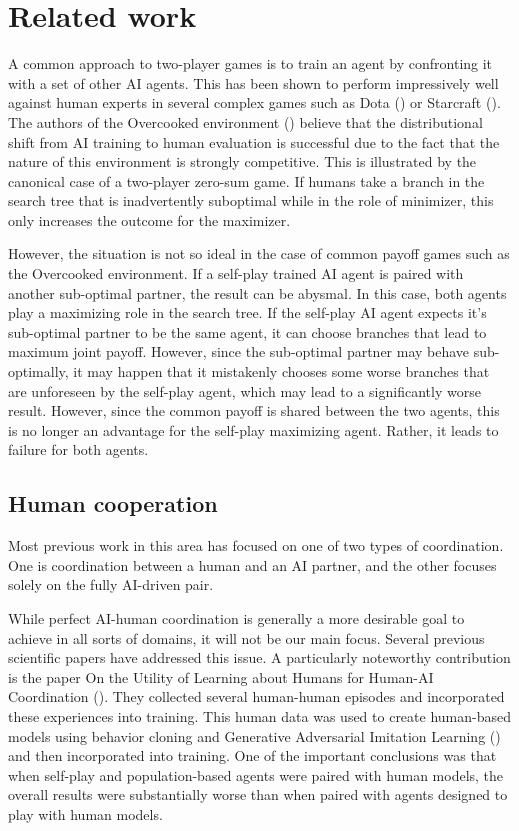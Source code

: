\chapter{Related work}\label{RelatedWorkChapter}

A common approach to two-player games is to train an agent by confronting it with a set of other AI agents.
This has been shown to perform impressively well against human experts in several complex games such as Dota (\cite{DotaOpenFive}) or Starcraft (\cite{Starcraft}).
The authors of the Overcooked environment (\cite{carroll2020utility}) believe that the distributional shift from AI training to human evaluation is successful due to the fact that the nature of this environment is strongly competitive.
This is illustrated by the canonical case of a two-player zero-sum game.
If humans take a branch in the search tree that is inadvertently suboptimal while in the role of minimizer, this only increases the outcome for the maximizer.

However, the situation is not so ideal in the case of common payoff games such as the Overcooked environment.
If a self-play trained AI agent is paired with another sub-optimal partner, the result can be abysmal. 
In this case, both agents play a maximizing role in the search tree. 
If the self-play AI agent expects it's sub-optimal partner to be the same agent, it can choose branches that lead to maximum joint payoff.
However, since the sub-optimal partner may behave sub-optimally, it may happen that it mistakenly chooses some worse branches that are unforeseen by the self-play agent, which may lead to a significantly worse result.
However, since the common payoff is shared between the two agents, this is no longer an advantage for the self-play maximizing agent.
Rather, it leads to failure for both agents.

\section{Human cooperation}
Most previous work in this area has focused on one of two types of coordination. 
One is coordination between a human and an AI partner, and the other focuses solely on the fully AI-driven pair.


\par

While perfect AI-human coordination is generally a more desirable goal to achieve in all sorts of domains, it will not be our main focus.  
Several previous scientific papers have addressed this issue. A particularly noteworthy contribution is the paper 
On the Utility of Learning about Humans for Human-AI Coordination (\cite{carroll2020utility}). 
They collected several human-human episodes and incorporated these experiences into training.
This human data was used to create human-based models using behavior cloning and Generative Adversarial Imitation Learning (\cite{Ho2016GenerativeAI}) and then incorporated into training.
One of the important conclusions was that when self-play and population-based agents were paired with human models, the overall results were substantially worse than when paired with agents designed to play with human models.

